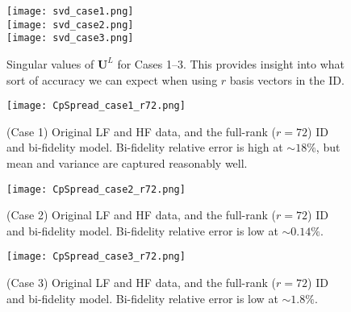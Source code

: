 \documentclass[11pt]{article}
\begin{document}
\begin{figure}[p]
\begin{center}
\texttt{[image: svd\_case1.png]} \\
\texttt{[image: svd\_case2.png]} \\
\texttt{[image: svd\_case3.png]}
\\[1ex]
\caption{Singular values of $\bm{U}^L$ for Cases 1--3. This provides insight into what sort of accuracy we can expect when using $r$ basis vectors in the ID.}
\label{fig:svd}
\end{center}
\end{figure}

\begin{figure}[p]
\begin{center}
\texttt{[image: CpSpread\_case1\_r72.png]}
\\[1ex]
\caption{(Case 1) Original LF and HF data, and the full-rank ($r=72$) ID and bi-fidelity model. Bi-fidelity relative error is high at $\sim 18\%$, but mean and variance are captured reasonably well.}
\label{fig:case1}
\end{center}
\end{figure}

\begin{figure}[p]
\begin{center}
\texttt{[image: CpSpread\_case2\_r72.png]}
\\[1ex]
\caption{(Case 2) Original LF and HF data, and the full-rank ($r=72$) ID and bi-fidelity model. Bi-fidelity relative error is low at $\sim 0.14\%$.}
\label{fig:case2}
\end{center}
\end{figure}

\begin{figure}[p]
\begin{center}
\texttt{[image: CpSpread\_case3\_r72.png]}
\\[1ex]
\caption{(Case 3) Original LF and HF data, and the full-rank ($r=72$) ID and bi-fidelity model. Bi-fidelity relative error is low at $\sim 1.8\%$.}
\label{fig:case3}
\end{center}
\end{figure}




\label{lastpage}
\end{document}
